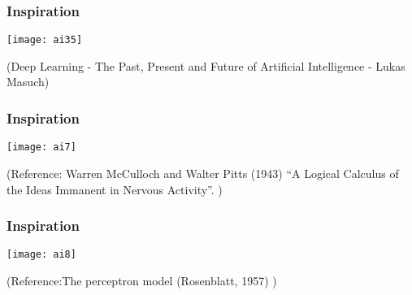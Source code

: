 \begin{frame}[fragile] \frametitle{Inspiration}
\begin{center}
\texttt{[image: ai35]}
\end{center}
{\tiny (Deep Learning - The Past, Present and Future of Artificial Intelligence - Lukas Masuch)}
\end{frame}
\begin{frame}[fragile] \frametitle{Inspiration}

\begin{center}
\texttt{[image: ai7]}
\end{center}
\tiny{(Reference: Warren McCulloch and Walter Pitts (1943) ``A Logical Calculus of the Ideas Immanent in Nervous Activity''. )}
\end{frame}

\begin{frame}[fragile] \frametitle{Inspiration}

\begin{center}
\texttt{[image: ai8]}
\end{center}
\tiny{(Reference:The perceptron model (Rosenblatt, 1957) )}
\end{frame}




